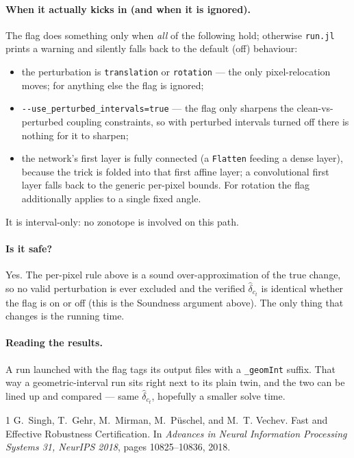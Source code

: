 \documentclass[11pt]{article}
\begin{document}
\paragraph{When it actually kicks in (and when it is ignored).}
The flag does something only when \emph{all} of the following hold; otherwise \texttt{run.jl} prints a
warning and silently falls back to the default (off) behaviour:
\begin{itemize}[noitemsep,topsep=2pt]
  \item the perturbation is \texttt{translation} or \texttt{rotation} --- the only pixel-relocation
        moves; for anything else the flag is ignored;
  \item \texttt{-{}-use\_perturbed\_intervals=true} --- the flag only sharpens the clean-vs-perturbed
        coupling constraints, so with perturbed intervals turned off there is nothing for it to sharpen;
  \item the network's first layer is fully connected (a \texttt{Flatten} feeding a dense layer), because
        the trick is folded into that first affine layer; a convolutional first layer falls back to the
        generic per-pixel bounds. For rotation the flag additionally applies to a single fixed angle.
\end{itemize}
It is interval-only: no zonotope is involved on this path.

\paragraph{Is it safe?}
Yes. The per-pixel rule above is a sound over-approximation of the true change, so no valid
perturbation is ever excluded and the verified $\hat{\delta}_{c_t}$ is identical whether the flag is on
or off (this is the Soundness argument above). The only thing that changes is the running time.

\paragraph{Reading the results.}
A run launched with the flag tags its output files with a \texttt{\_geomInt} suffix. That way a
geometric-interval run sits right next to its plain twin, and the two can be lined up and compared
--- same $\hat{\delta}_{c_t}$, hopefully a smaller solve time.

\begin{thebibliography}{1}
G.~Singh, T.~Gehr, M.~Mirman, M.~P\"uschel, and M.~T. Vechev.
\newblock Fast and Effective Robustness Certification.
\newblock In \emph{Advances in Neural Information Processing Systems 31, NeurIPS 2018}, pages 10825--10836, 2018.
\end{thebibliography}
\end{document}
